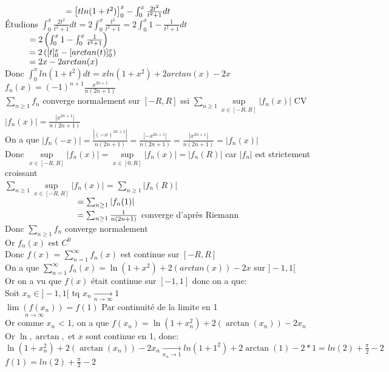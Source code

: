 \documentclass{article}
\newcommand\tab[1][1cm]{\hspace*{#1}}
\newcommand{\mylim}[2]{\underset{#1 \rightarrow #2}{\longrightarrow}}
\newcommand{\mysupp}[1]{\underset{x \in #1}{\sup}}
\begin{document}
$\tab[2.5cm] = \left[tln(1 + t^2)\right]^x_0 - \int_0^x \frac{2t^2}{t^2 + 1} dt$\\
Étudions $\int_0^x \frac{2t^2}{t^2 + 1} dt = 2\int_0^x \frac{t^2}{t^2 + 1} = 2\int_0^x 1 - \frac{1}{t^2 + 1}dt$\\
$\tab = 2\left(\int_0^x 1 - \int_0^x \frac{1}{t^2 + 1}\right)$\\
$\tab = 2\left([t]_0^x - [arctan(t)]_0^x\right)$\\
$\tab = 2x - 2arctan(x)$\\
Donc $\int_0^x ln(1 + t^2)dt = xln(1 + x^2) + 2arctan(x) -2x$
\newpage
\noindent $f_n(x) = (-1)^{n+1} \frac{x^{2n  + 1}}{n(2n + 1)}$\\
$\sum_{n \geq 1} f_n$ converge normalement sur $[-R, R]$ ssi $\sum_{n \geq 1} \mysupp{[-R, R]}|f_n(x)|$ CV\\
$|f_n(x)| = \frac{|x^{2n+1}|}{n(2n + 1)}$\\
On a que $|f_n(-x)| = \frac{|(-x)^{2n+1}|}{n(2n + 1)} = \frac{|-x^{2n+1}|}{n(2n + 1)} = \frac{|x^{2n+1}|}{n(2n + 1)} = |f_n(x)|$\\
Donc $\mysupp{[-R, R]}|f_n(x)| = \mysupp{[0, R]}|f_n(x)| = |f_n(R)|$ car $|f_n|$ est strictement croissant\\
$\sum_{n \geq 1} \mysupp{[-R, R]}|f_n(x)|$ = $\sum_{n \geq 1} |f_n(R)|$\\
$\tab[3cm] = \sum_{n \geq 1} |f_n(1)|$\\
$\tab[3cm] = \sum_{n \geq 1} \frac{1}{n(2n + 1)}$ converge d'après Riemann\\
Donc $\sum_{n \geq 1} f_n$ converge normalement\\
Or $f_n(x)$ est $C^0$\\
Donc $f(x)$ = $\sum_{n=1}^{\infty} f_n(x)$ est continue sur $[-R, R]$\\
On a que 
$\sum_{n=1}^{\infty} f_n(x) = \ln(1 + x^2) + 2(arctan(x)) - 2x$ sur $]-1, 1[$\\
Or on a vu que $f(x)$ était continue sur $[-1, 1]$ donc on a que:\\
Soit $x_n \in ]-1, 1[$ tq $x_n \mylim{n}{\infty} 1$\\
$\underset{n \rightarrow \infty}{\lim(f(x_n))} = f(1)$ Par continuité de la limite en 1\\
Or comme $x_n$ < 1, on a que $f(x_n) = \ln(1 + x_n^2) + 2(\arctan(x_n)) - 2x_n$\\
Or $\ln, \arctan,$ et $x$ sont continue en 1, donc:\\
$\ln(1 + x_n^2) + 2(\arctan(x_n)) - 2x_n \mylim{x_n}{1} ln(1 + 1^2) + 2 \arctan(1) - 2 * 1 = ln(2) + \frac{\pi}{2} - 2$\\
$f(1) = ln(2) + \frac{\pi}{2} - 2$ 
\end{document}

